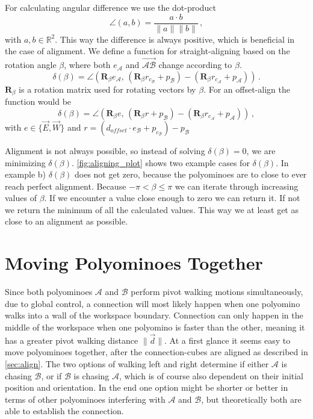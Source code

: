 For calculating angular difference we use the dot-product
\begin{equation*}
\angle (a,b) = \frac{a \cdot b}{\lVert a \rVert \lVert b \rVert} \,,
\end{equation*}
with $a,b \in \mathbb{R}^2$. This way the difference is always positive, which is beneficial in the case of alignment.
We define a function for straight-aligning based on the rotation angle $\beta$, where both $e_\mathcal{A}$ and $\overrightarrow{\mathcal{A}\mathcal{B}}$ change according to $\beta$.
\begin{equation}
\delta(\beta) = \angle \left( \mathbf{R}_\beta e_\mathcal{A}, \, \left( \mathbf{R}_\beta r_{c_\mathcal{B}} + p_\mathcal{B} \right) - \left( \mathbf{R}_\beta r_{c_\mathcal{A}} + p_\mathcal{A} \right)\right) \,.
\end{equation}
$\mathbf{R}_\beta$ is a rotation matrix used for rotating vectors by $\beta$.
For an offset-align the function would be
\begin{equation}
\delta(\beta) = \angle \left( \mathbf{R}_\beta e, \, \left( \mathbf{R}_\beta r + p_\mathcal{B} \right) - \left( \mathbf{R}_\beta r_{c_\mathcal{A}} + p_\mathcal{A} \right)\right) \,,
\end{equation}
with $e \in \{ \vec{E}, \vec{W}\}$ and $r = \left( d_\textit{offset} \cdot e_\mathcal{B} + p_{c_\mathcal{B}} \right) - p_\mathcal{B}$

Alignment is not always possible, so instead of solving $\delta(\beta) = 0$, we are minimizing $\delta(\beta)$.
\autoref{fig:aligning_plot} shows two example cases for $\delta(\beta)$.
In example b) $\delta(\beta)$ does not get zero, because the polyominoes are to close to ever reach perfect alignment.
Because $-\pi < \beta \leq \pi$ we can iterate through increasing values of $\beta$.
If we encounter a value close enough to zero we can return it.
If not we return the minimum of all the calculated values.
This way we at least get as close to an alignment as possible.


\section{Moving Polyominoes Together}
\label{sec:walk_wait}

Since both polyominoes $\mathcal{A}$ and $\mathcal{B}$ perform pivot walking motions simultaneously, due to global control, a connection will most likely happen when one polyomino walks into a wall of the workspace boundary.
Connection can only happen in the middle of the workspace when one polyomino is faster than the other, meaning it has a greater pivot walking distance $\lVert \vec{d} \rVert$.
At a first glance it seems easy to move polyominoes together, after the connection-cubes are aligned as described in \autoref{sec:align}.
The two options of walking left and right determine if either $\mathcal{A}$ is chasing $\mathcal{B}$, or if $\mathcal{B}$ is chasing $\mathcal{A}$, which is of course also dependent on their initial position and orientation.
In the end one option might be shorter or better in terms of other polyominoes interfering with $\mathcal{A}$ and $\mathcal{B}$, but theoretically both are able to establish the connection.

